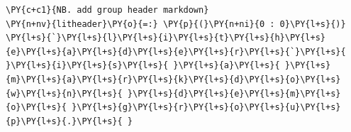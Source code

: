     \begin{tcolorbox}[breakable, size=fbox, boxrule=1pt, pad at break*=1mm,colback=cellbackground, colframe=cellborder]
\begin{Verbatim}[commandchars=\\\{\}]
\PY{c+c1}{NB. add group header markdown}
\PY{n+nv}{litheader}\PY{o}{=:} \PY{p}{(}\PY{n+ni}{0 : 0}\PY{l+s}{)}
\PY{l+s}{`}\PY{l+s}{l}\PY{l+s}{i}\PY{l+s}{t}\PY{l+s}{h}\PY{l+s}{e}\PY{l+s}{a}\PY{l+s}{d}\PY{l+s}{e}\PY{l+s}{r}\PY{l+s}{`}\PY{l+s}{ }\PY{l+s}{i}\PY{l+s}{s}\PY{l+s}{ }\PY{l+s}{a}\PY{l+s}{ }\PY{l+s}{m}\PY{l+s}{a}\PY{l+s}{r}\PY{l+s}{k}\PY{l+s}{d}\PY{l+s}{o}\PY{l+s}{w}\PY{l+s}{n}\PY{l+s}{ }\PY{l+s}{d}\PY{l+s}{e}\PY{l+s}{m}\PY{l+s}{o}\PY{l+s}{ }\PY{l+s}{g}\PY{l+s}{r}\PY{l+s}{o}\PY{l+s}{u}\PY{l+s}{p}\PY{l+s}{.}\PY{l+s}{ }


\end{Verbatim}
\end{tcolorbox}
